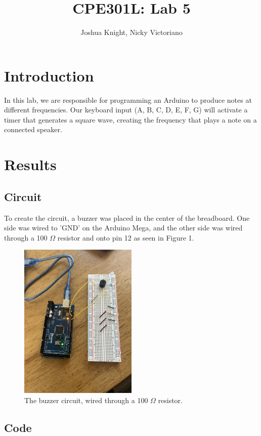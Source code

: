 \documentclass{article}
\title{CPE301L: Lab 5}
\author{Joshua Knight, Nicky Victoriano}
\begin{document}
\maketitle
 
\section{Introduction}

In this lab, we are responsible for programming an Arduino to produce notes at different frequencies. Our keyboard input (A, B, C, D, E, F, G) will activate a timer that generates a square wave, creating the frequency that plays a note on a connected speaker.

\section{Results}

\subsection{Circuit}

To create the circuit, a buzzer was placed in the center of the breadboard. One side was wired to 'GND' on the Arduino Mega, and the other side was wired through a 100 $\Omega$ resistor and onto pin 12 as seen in Figure 1. 

\begin{figure}[h!]
\centering
\includegraphics[width=0.5\textwidth]{circuit.JPG}
\caption{\label{fig:circuit}The buzzer circuit, wired through a 100 $\Omega$ resistor.}
\end{figure}

\subsection{Code}
\end{document}
